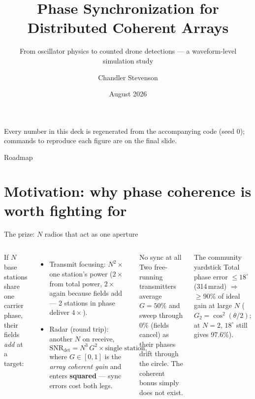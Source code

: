 \documentclass[aspectratio=169,10pt]{beamer}
\title[Distributed Phase Synchronization]{Phase Synchronization for
Distributed Coherent Arrays}
\subtitle{From oscillator physics to counted drone detections ---
a waveform-level simulation study}
\author{Chandler Stevenson}
\institute{Princeton University}
\date{August 2026}
\begin{document}
\begin{frame}
  \titlepage
  \begin{center}\scriptsize
    Every number in this deck is regenerated from the accompanying
    code (seed 0); commands to reproduce each figure are on the final
    slide.
  \end{center}
\end{frame}

\begin{frame}{Roadmap}
  \tableofcontents
\end{frame}

\section{Motivation: why phase coherence is worth fighting for}

\begin{frame}{The prize: $N$ radios that act as one aperture}
  \begin{columns}[T]
    If $N$ base stations share one carrier phase, their fields
    \emph{add} at a target:
    \begin{itemize}
      \item Transmit focusing: $N^2\times$ one station's power
            ($2\times$ from total power, $2\times$ again because
            fields add --- 2 stations in phase deliver $4\times$).
      \item Radar (round trip): another $N$ on receive,
      \[
        \mathrm{SNR}_{\det} = N^3\, G^2 \times \text{single station},
      \]
      where $G\in[0,1]$ is the \emph{array coherent gain} and enters
      \textbf{squared} --- sync errors cost both legs.
    \end{itemize}
    \begin{block}{\small No sync at all}
      \small Two free-running transmitters average $G=50\%$ and sweep
      through $0\%$ (fields cancel) as their phases drift through the
      circle. The coherent bonus simply does not exist.
    \end{block}
    \begin{block}{\small The community yardstick}
      \small Total phase error $\le 18^\circ$ (314\,mrad)
      $\Rightarrow$ $\ge 90\%$ of ideal gain at large $N$
      ($G_2=\cos^2(\theta/2)$; at $N=2$, $18^\circ$ still gives
      97.6\%).
    \end{block}
  \end{columns}
\end{frame}
\end{document}
